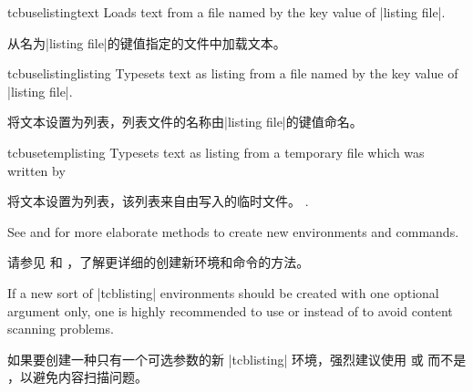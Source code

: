 \begin{docCommand}{tcbuselistingtext}{}
Loads text from a file named by the key value of |listing file|.

从名为|listing file|的键值指定的文件中加载文本。
\begin{dispExample}
\tcbuselistingtext
\end{dispExample}
\end{docCommand}


\begin{docCommand}{tcbuselistinglisting}{}
Typesets text as listing from a file named by the key value of |listing file|.

将文本设置为列表，列表文件的名称由|listing file|的键值命名。
\begin{dispExample}
\tcbuselistinglisting
\end{dispExample}
\end{docCommand}

\begin{docCommand}{tcbusetemplisting}{}
Typesets text as listing from a temporary file which was written by

将文本设置为列表，该列表来自由写入的临时文件。
.
\end{docCommand}


\begin{marker}
See  and  for more
elaborate methods to create new environments and commands.

请参见  和 ，了解更详细的创建新环境和命令的方法。
\end{marker}
\begin{marker}
If a new sort of |tcblisting| environments should be created with
one optional argument only, one is highly recommended to use
 or 
instead of  to
avoid content scanning problems.

如果要创建一种只有一个可选参数的新 |tcblisting| 环境，强烈建议使用  或  而不是 ，以避免内容扫描问题。
\end{marker}


